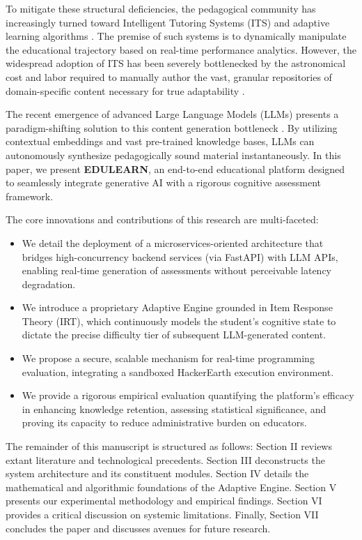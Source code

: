 \documentclass[conference]{IEEEtran}
\begin{document}
To mitigate these structural deficiencies, the pedagogical community has increasingly turned toward Intelligent Tutoring Systems (ITS) and adaptive learning algorithms \cite{corbett1997knowledge}. The premise of such systems is to dynamically manipulate the educational trajectory based on real-time performance analytics. However, the widespread adoption of ITS has been severely bottlenecked by the astronomical cost and labor required to manually author the vast, granular repositories of domain-specific content necessary for true adaptability \cite{brusilovsky2003adaptive}. 

The recent emergence of advanced Large Language Models (LLMs) presents a paradigm-shifting solution to this content generation bottleneck \cite{kasneci2023chatgpt}. By utilizing contextual embeddings and vast pre-trained knowledge bases, LLMs can autonomously synthesize pedagogically sound material instantaneously. In this paper, we present \textbf{EDULEARN}, an end-to-end educational platform designed to seamlessly integrate generative AI with a rigorous cognitive assessment framework.

The core innovations and contributions of this research are multi-faceted:
\begin{itemize}
    \item We detail the deployment of a microservices-oriented architecture that bridges high-concurrency backend services (via FastAPI) with LLM APIs, enabling real-time generation of assessments without perceivable latency degradation.
    \item We introduce a proprietary Adaptive Engine grounded in Item Response Theory (IRT), which continuously models the student's cognitive state to dictate the precise difficulty tier of subsequent LLM-generated content.
    \item We propose a secure, scalable mechanism for real-time programming evaluation, integrating a sandboxed HackerEarth execution environment.
    \item We provide a rigorous empirical evaluation quantifying the platform's efficacy in enhancing knowledge retention, assessing statistical significance, and proving its capacity to reduce administrative burden on educators.
\end{itemize}

The remainder of this manuscript is structured as follows: Section II reviews extant literature and technological precedents. Section III deconstructs the system architecture and its constituent modules. Section IV details the mathematical and algorithmic foundations of the Adaptive Engine. Section V presents our experimental methodology and empirical findings. Section VI provides a critical discussion on systemic limitations. Finally, Section VII concludes the paper and discusses avenues for future research.
\end{document}
